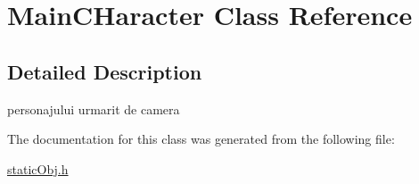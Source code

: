 \hypertarget{class_main_c_haracter}{\section{Main\-C\-Haracter Class Reference}
\label{class_main_c_haracter}
}


\subsection{Detailed Description}
personajului urmarit de camera 

The documentation for this class was generated from the following file\-:\begin{DoxyCompactItemize}
\item 
\hyperlink{static_obj_8h}{static\-Obj.\-h}\end{DoxyCompactItemize}
